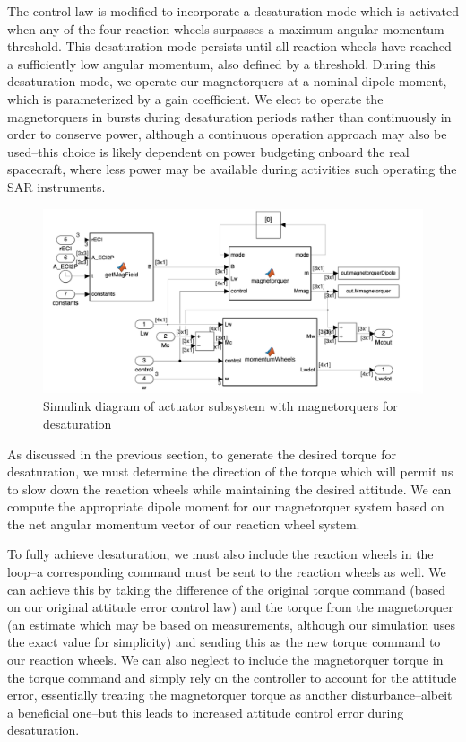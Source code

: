 The control law is modified to incorporate a desaturation mode which is activated when any of the four reaction wheels surpasses a maximum angular momentum threshold. This desaturation mode persists until all reaction wheels have reached a sufficiently low angular momentum, also defined by a threshold. During this desaturation mode, we operate our magnetorquers at a nominal dipole moment, which is parameterized by a gain coefficient. We elect to operate the magnetorquers in bursts during desaturation periods rather than continuously in order to conserve power, although a continuous operation approach may also be used–this choice is likely dependent on power budgeting onboard the real spacecraft, where less power may be available during activities such operating the SAR instruments.

\begin{figure}[H]
\centering
\includegraphics[scale=0.25]{Images/ps10_actuators.png}
\caption{Simulink diagram of actuator subsystem with magnetorquers for desaturation}
\label{fig:ps10_actuators}
\end{figure}

As discussed in the previous section, to generate the desired torque for desaturation, we must determine the direction of the torque which will permit us to slow down the reaction wheels while maintaining the desired attitude. We can compute the appropriate dipole moment for our magnetorquer system based on the net angular momentum vector of our reaction wheel system.

To fully achieve desaturation, we must also include the reaction wheels in the loop–a corresponding command must be sent to the reaction wheels as well. We can achieve this by taking the difference of the original torque command (based on our original attitude error control law) and the torque from the magnetorquer (an estimate which may be based on measurements, although our simulation uses the exact value for simplicity) and sending this as the new torque command to our reaction wheels. We can also neglect to include the magnetorquer torque in the torque command and simply rely on the controller to account for the attitude error, essentially treating the magnetorquer torque as another disturbance–albeit a beneficial one–but this leads to increased attitude control error during desaturation.


